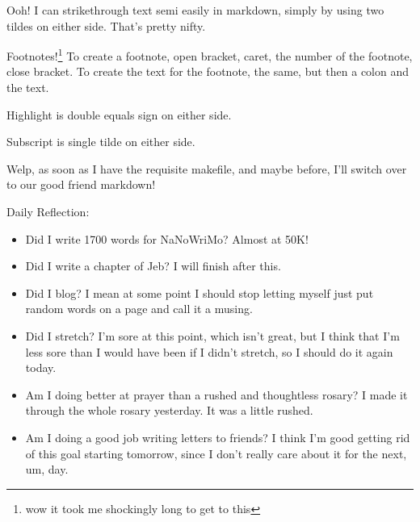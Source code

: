\documentclass[12pt]{article}[titlepage]
\newcommand{\1}{\={a}}
\newcommand{\2}{\={e}}
\newcommand{\3}{\={\i}}
\newcommand{\4}{\=o}
\newcommand{\5}{\=u}
\newcommand{\6}{\={A}}
\renewcommand{\,}{\textsuperscript{,}}
\begin{document}
Ooh! I can strikethrough text semi easily in markdown, simply by using two tildes on either side.
That's pretty nifty.

Footnotes!\footnote{wow it took me shockingly long to get to this}
To create a footnote, open bracket, caret, the number of the footnote, close bracket.
To create the text for the footnote, the same, but then a colon and the text.

Highlight is double equals sign on either side.

Subscript is single tilde on either side.

Welp, as soon as I have the requisite makefile, and maybe before, I'll switch over to our good friend markdown!

Daily Reflection:
\begin{itemize}
\item Did I write 1700 words for NaNoWriMo? Almost at 50K! 
\item Did I write a chapter of Jeb? I will finish after this.
\item Did I blog? I mean at some point I should stop letting myself just put random words on a page and call it a musing.
\item Did I stretch? I'm sore at this point, which isn't great, but I think that I'm less sore than I would have been if I didn't stretch, so I should do it again today.
\item Am I doing better at prayer than a rushed and thoughtless rosary? I made it through the whole rosary yesterday. It was a little rushed.
\item Am I doing a good job writing letters to friends? I think I'm good getting rid of this goal starting tomorrow, since I don't really care about it for the next, um, day.
\end{itemize}
\end{document}
